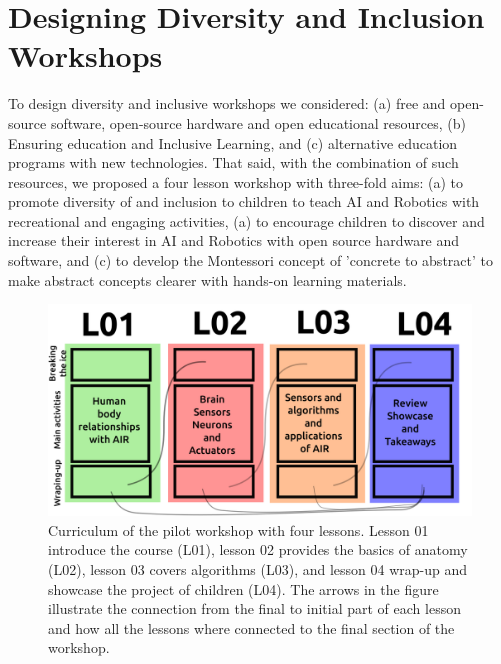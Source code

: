 \documentclass[conference]{IEEEtran}
\begin{document}
\section{Designing Diversity and Inclusion Workshops}
To design diversity and inclusive workshops we considered: (a) free and open-source software, open-source hardware and open educational resources, (b) Ensuring education and Inclusive Learning, and (c) alternative education programs with new technologies.
That said, with the combination of such resources, we proposed a four lesson workshop with three-fold aims:
(a) to promote  diversity of and inclusion to children to teach AI and Robotics with recreational and engaging activities,
(a) to encourage children to discover and increase their interest in AI and Robotics with open source hardware and software, and  
(c) to develop  the Montessori concept of 'concrete to abstract' to make abstract concepts clearer with hands-on learning materials.

\begin{figure}[t]
    \centerline{\includegraphics[width=\linewidth]{curriculum-design/versions/drawing-v04.png}}  %
    \caption{Curriculum of the pilot workshop with four lessons. 
    Lesson 01 introduce the course (L01), 
    lesson 02 provides the basics of anatomy (L02), 
    lesson 03 covers algorithms (L03), and 
    lesson 04 wrap-up and showcase the project of children (L04).
    The arrows in the figure illustrate the connection from the final to initial part of each lesson and how all the lessons where connected to the final section of the workshop.
    }
    \label{fig:curriculum}
\end{figure}
\end{document}
